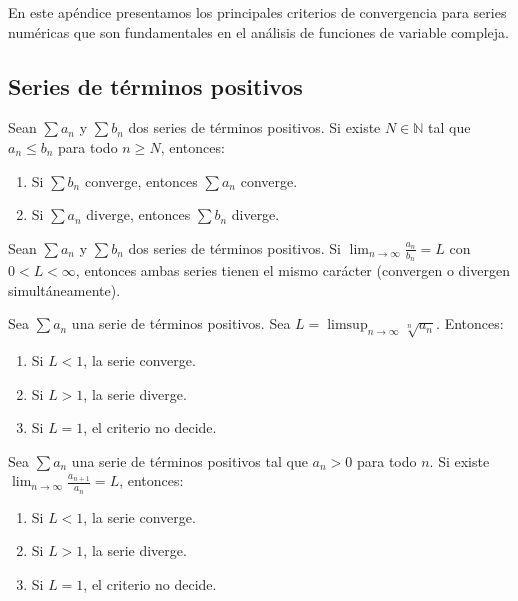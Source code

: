 
En este apéndice presentamos los principales criterios de convergencia para series numéricas que son fundamentales en el análisis de funciones de variable compleja.

\subsection{Series de términos positivos}

\begin{teorema}
    Sean $\sum a_n$ y $\sum b_n$ dos series de términos positivos. Si existe $N \in \mathbb{N}$ tal que $a_n \leq b_n$ para todo $n \geq N$, entonces:
    \begin{enumerate}
        \item Si $\sum b_n$ converge, entonces $\sum a_n$ converge.
        \item Si $\sum a_n$ diverge, entonces $\sum b_n$ diverge.
    \end{enumerate}
\end{teorema}

\begin{teorema}
    Sean $\sum a_n$ y $\sum b_n$ dos series de términos positivos. Si $\lim_{n \to \infty} \frac{a_n}{b_n} = L$ con $0 < L < \infty$, entonces ambas series tienen el mismo carácter (convergen o divergen simultáneamente).
\end{teorema}

\begin{teorema}
    Sea $\sum a_n$ una serie de términos positivos. Sea $L = \limsup_{n \to \infty} \sqrt[n]{a_n}$. Entonces:
    \begin{enumerate}
        \item Si $L < 1$, la serie converge.
        \item Si $L > 1$, la serie diverge.
        \item Si $L = 1$, el criterio no decide.
    \end{enumerate}
\end{teorema}

\begin{teorema}
    Sea $\sum a_n$ una serie de términos positivos tal que $a_n > 0$ para todo $n$. Si existe $\lim_{n \to \infty} \frac{a_{n+1}}{a_n} = L$, entonces:
    \begin{enumerate}
        \item Si $L < 1$, la serie converge.
        \item Si $L > 1$, la serie diverge.
        \item Si $L = 1$, el criterio no decide.
    \end{enumerate}
\end{teorema}

